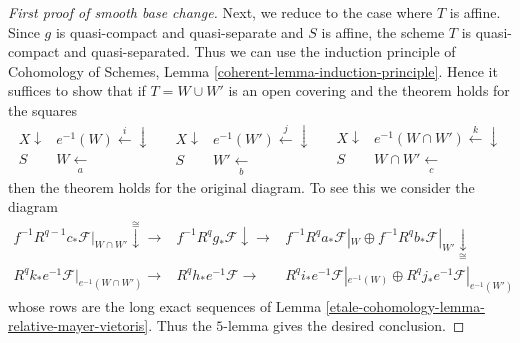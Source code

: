 \begin{proof}[First proof of smooth base change]
\medskip\noindent
Next, we reduce to the case where $T$ is affine. Since $g$ is quasi-compact
and quasi-separate and $S$ is affine, the scheme $T$ is quasi-compact and
quasi-separated. Thus we can use the induction principle of
Cohomology of Schemes, Lemma \ref{coherent-lemma-induction-principle}.
Hence it suffices to show that if $T = W \cup W'$
is an open covering and the theorem holds for the squares
$$
\begin{array}{cc}X \downarrow & e^{-1}(W) \overset{i}{\longleftarrow}\downarrow \\ S & W \underset{a}{\longleftarrow}\end{array}
\quad
\begin{array}{cc}X \downarrow & e^{-1}(W') \overset{j}{\longleftarrow}\downarrow \\ S & W' \underset{b}{\longleftarrow}\end{array}
\quad
\begin{array}{cc}X \downarrow & e^{-1}(W \cap W') \overset{k}{\longleftarrow}\downarrow \\ S & W \cap W' \underset{c}{\longleftarrow}\end{array}
$$
then the theorem holds for the original diagram. To see this we consider the
diagram
$$
\begin{array}{ccc}f^{-1}R^{q - 1}c_*\mathcal{F}|_{W \cap W'} \overset{\cong}{\downarrow}\longrightarrow & f^{-1}R^qg_*\mathcal{F} \downarrow\longrightarrow & f^{-1}R^qa_*\mathcal{F}|_W \oplus
f^{-1}R^qb_*\mathcal{F}|_{W'} \underset{\cong}{\downarrow} \\ R^qk_*e^{-1}\mathcal{F}|_{e^{-1}(W \cap W')} \longrightarrow & R^qh_*e^{-1}\mathcal{F} \longrightarrow & R^qi_*e^{-1}\mathcal{F}|_{e^{-1}(W)} \oplus
R^qj_*e^{-1}\mathcal{F}|_{e^{-1}(W')}\end{array}
$$
whose rows are the long exact sequences of
Lemma \ref{etale-cohomology-lemma-relative-mayer-vietoris}.
Thus the $5$-lemma gives the desired conclusion.


\end{proof}
